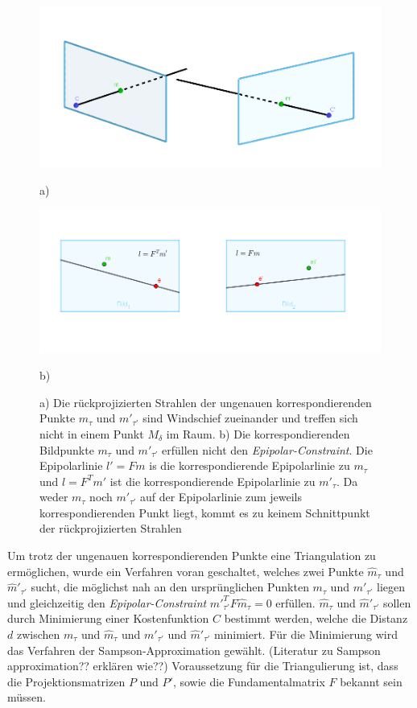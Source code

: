 \begin{figure}[!htb]
	\includegraphics[width=\linewidth]{images/problemTriangulation.png}
	\caption{a)}
	\label{fig:ProblemTraingulation}
	\endminipage\hfill
	\includegraphics[width=\linewidth]{images/SampsAppx.png}
	\caption{b)}
	\label{fig:lFm}
	\endminipage\hfill
	\caption{ a) Die rückprojizierten Strahlen der ungenauen korrespondierenden Punkte $m_\tau$ und $m'_{\tau'}$ sind Windschief zueinander und treffen sich nicht in einem Punkt $M_\delta$ im Raum. b) Die korrespondierenden Bildpunkte $m_\tau$ und $m'_{\tau'}$ erfüllen nicht den \textit{Epipolar-Constraint}. Die Epipolarlinie $l' = Fm$ is die korrespondierende Epipolarlinie zu $m_\tau$ und $l = F^Tm'$ ist die korrespondierende Epipolarlinie zu $m'_{\tau}$. Da weder $m_\tau$ noch $m'_{\tau'}$ auf der Epipolarlinie zum jeweils korrespondierenden Punkt liegt, kommt es zu keinem Schnittpunkt der rückprojizierten Strahlen}
\end{figure}

Um trotz der ungenauen korrespondierenden Punkte eine Triangulation zu ermöglichen, wurde ein Verfahren voran geschaltet, welches zwei Punkte $\hat{m}_\tau$ und $\hat{m}'_{\tau'}$ sucht, die möglichst nah an den ursprünglichen Punkten $m_\tau$ und $m'_{\tau'}$ liegen und gleichzeitig den \textit{Epipolar-Constraint} $\hat{m}'^T_{\tau'}F\hat{m}_\tau = 0$ erfüllen. $\hat{m}_\tau$ und $\hat{m}'_{\tau'}$ sollen durch Minimierung einer Kostenfunktion $C$ bestimmt werden, welche die Distanz  $d$ zwischen $m_\tau$ und $\hat{m}_\tau$ und $m'_{\tau'}$ und $\hat{m}'_{\tau'}$ minimiert. Für die Minimierung wird das Verfahren der Sampson-Approximation gewählt\cite{HZ}. (Literatur zu Sampson approximation?? erklären wie??) Voraussetzung für die Triangulierung ist, dass die Projektionsmatrizen $P$ und $P'$, sowie die Fundamentalmatrix $F$ bekannt sein müssen\cite{HZ}.

